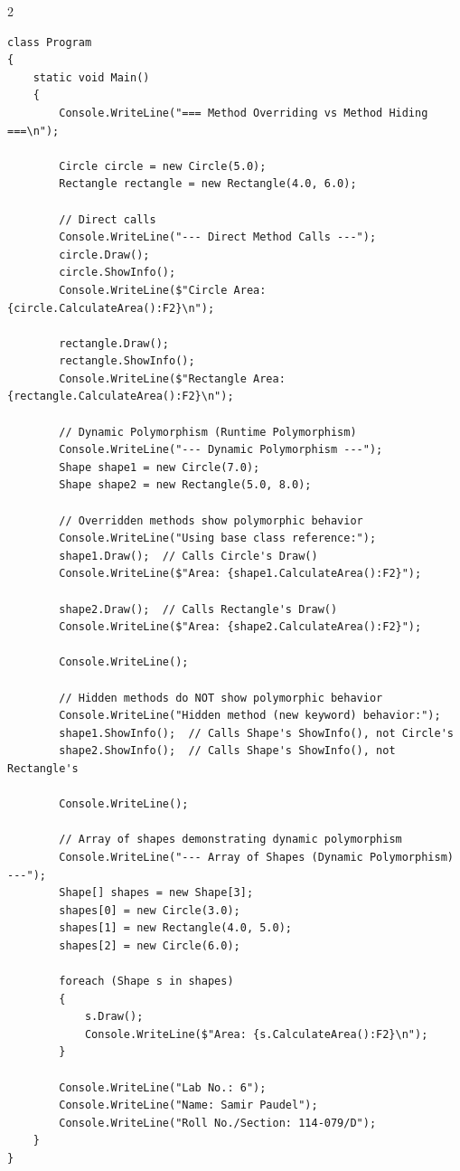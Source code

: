 \documentclass[10pt,a4paper]{article}
\begin{document}
\begin{multicols}{2}
\begin{lstlisting}
class Program
{
    static void Main()
    {
        Console.WriteLine("=== Method Overriding vs Method Hiding ===\n");
        
        Circle circle = new Circle(5.0);
        Rectangle rectangle = new Rectangle(4.0, 6.0);
        
        // Direct calls
        Console.WriteLine("--- Direct Method Calls ---");
        circle.Draw();
        circle.ShowInfo();
        Console.WriteLine($"Circle Area: {circle.CalculateArea():F2}\n");
        
        rectangle.Draw();
        rectangle.ShowInfo();
        Console.WriteLine($"Rectangle Area: {rectangle.CalculateArea():F2}\n");
        
        // Dynamic Polymorphism (Runtime Polymorphism)
        Console.WriteLine("--- Dynamic Polymorphism ---");
        Shape shape1 = new Circle(7.0);
        Shape shape2 = new Rectangle(5.0, 8.0);
        
        // Overridden methods show polymorphic behavior
        Console.WriteLine("Using base class reference:");
        shape1.Draw();  // Calls Circle's Draw()
        Console.WriteLine($"Area: {shape1.CalculateArea():F2}");
        
        shape2.Draw();  // Calls Rectangle's Draw()
        Console.WriteLine($"Area: {shape2.CalculateArea():F2}");
        
        Console.WriteLine();
        
        // Hidden methods do NOT show polymorphic behavior
        Console.WriteLine("Hidden method (new keyword) behavior:");
        shape1.ShowInfo();  // Calls Shape's ShowInfo(), not Circle's
        shape2.ShowInfo();  // Calls Shape's ShowInfo(), not Rectangle's
        
        Console.WriteLine();
        
        // Array of shapes demonstrating dynamic polymorphism
        Console.WriteLine("--- Array of Shapes (Dynamic Polymorphism) ---");
        Shape[] shapes = new Shape[3];
        shapes[0] = new Circle(3.0);
        shapes[1] = new Rectangle(4.0, 5.0);
        shapes[2] = new Circle(6.0);
        
        foreach (Shape s in shapes)
        {
            s.Draw();
            Console.WriteLine($"Area: {s.CalculateArea():F2}\n");
        }
        
        Console.WriteLine("Lab No.: 6");
        Console.WriteLine("Name: Samir Paudel");
        Console.WriteLine("Roll No./Section: 114-079/D");
    }
}
\end{lstlisting}
\end{multicols}
\end{document}
